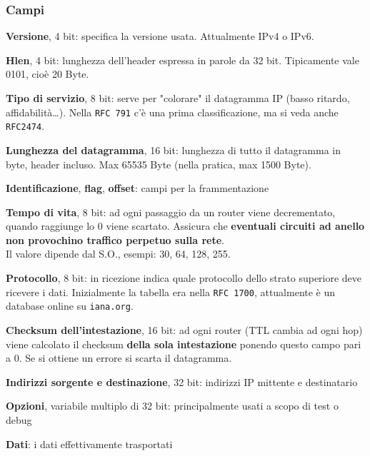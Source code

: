 \documentclass[10pt]{article}
\begin{document}
\subsubsection{Campi}
\begin{list}{}{}
\item \textbf{Versione}, 4 bit: specifica la versione usata. Attualmente IPv4 o IPv6.
\item \textbf{Hlen}, 4 bit: lunghezza dell'header espressa in parole da 32 bit. Tipicamente vale 0101, cioè 20 Byte.
\item \textbf{Tipo di servizio}, 8 bit: serve per "colorare" il datagramma IP (basso ritardo, affidabilità\ldots). Nella \texttt{RFC 791} c'è una prima classificazione, ma si veda anche \texttt{RFC2474}.
\item \textbf{Lunghezza del datagramma}, 16 bit: lunghezza di tutto il datagramma in byte, header incluso. Max 65535 Byte (nella pratica, max 1500 Byte).
\item \textbf{Identificazione}, \textbf{flag}, \textbf{offset}: campi per la frammentazione
\item \textbf{Tempo di vita}, 8 bit: ad ogni passaggio da un router viene decrementato, quando raggiunge lo 0 viene scartato. Assicura che \textbf{eventuali circuiti ad anello non provochino traffico perpetuo sulla rete}.\\
Il valore dipende dal S.O., esempi: 30, 64, 128, 255.
\item \textbf{Protocollo}, 8 bit: in ricezione indica quale protocollo dello strato superiore deve ricevere i dati. Inizialmente la tabella era nella \texttt{RFC 1700}, attualmente è un database online su \texttt{iana.org}.
\item \textbf{Checksum dell'intestazione}, 16 bit: ad ogni router (TTL cambia ad ogni hop) viene calcolato il checksum \textbf{della sola intestazione} ponendo questo campo pari a 0. Se si ottiene un errore si scarta il datagramma.
\item \textbf{Indirizzi sorgente e destinazione}, 32 bit: indirizzi IP mittente e destinatario
\item \textbf{Opzioni}, variabile multiplo di 32 bit: principalmente usati a scopo di test o debug
\item \textbf{Dati}: i dati effettivamente trasportati
\end{list}
\end{document}
